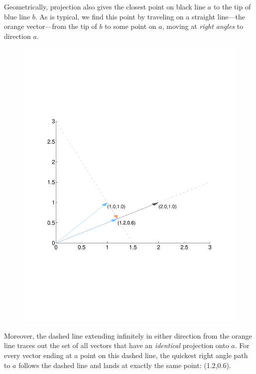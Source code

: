 \documentclass[a4paper,12pt]{scrartcl}
\begin{document}
Geometrically, projection also gives the closest point on black line $a$
to the tip of blue line $b$. As is typical, we find this point by
traveling on a straight line---the orange vector---from the tip of $b$
to some point on $a$, moving at \emph{right angles} to direction $a$.
\begin{figure}[htpb!]
  \centering
  \includegraphics[scale=0.4, trim={2cm, 7.2cm, 2cm, 7.2cm}, clip]{Plots/StateSpaceGeometry4.pdf}
\end{figure}

\clearpage
Moreover, the dashed line extending infinitely in either direction from
the orange line traces out the set of all vectors that have an
\emph{identical} projection onto $a$. For every vector ending at a point
on this dashed line, the quickest right angle path to $a$ follows the
dashed line and lands at exactly the same point: (1.2,0.6).
\end{document}
